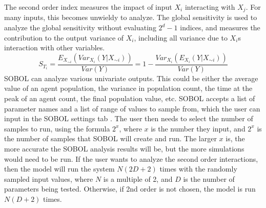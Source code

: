 The second order index measures the impact of input $X_i$ interacting with $X_j$. For many inputs, this becomes unwieldy to analyze. 
The global sensitivity is used to analyze the global sensitivity without evaluating $2^d-1$ indices, and measures the contribution to the output variance of $X_i$, including all variance due to $X_i$s interaction with other variables. 
\[
    S_{T_i} = \frac{E_{X_{\sim i}}(Var_{X_i}(Y|X_{\sim i}))}{Var(Y)} = 1 - \frac{Var_{X_i}(E_{X_i}(Y|X_{\sim i}))}{Var(Y)}
\]
SOBOL can analyze various univariate outputs. 
This could be either the average value of an agent population, the variance in population count, the time at the peak of an agent count, the final population value, etc. \newline
SOBOL accepts a list of parameter names and a list of range of values to sample from, which the user can input in the SOBOL settings tab . 
The user then needs to select the number of samples to run, using the formula $2^x$, where $x$ is the number they input, and $2^x$ is the number of samples that SOBOL will create and run. 
The larger $x$ is, the more accurate the SOBOL analysis results will be, but the more simulations would need to be run. \newline 
If the user wants to analyze the second order interactions, then the model will run the system $N(2D+2)$ times with the randomly sampled input values, where $N$ is a multiple of 2, and $D$ is the number of parameters being tested. 
Otherwise, if 2nd order is not chosen, the model is run $N(D+2)$ times. 

